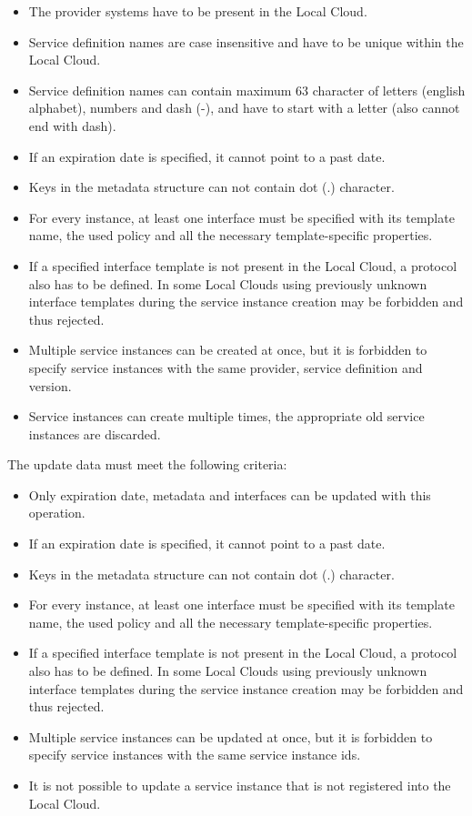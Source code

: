 \documentclass[a4paper]{arrowhead}
\begin{document}
\begin{itemize}
    \item The provider systems have to be present in the Local Cloud.
    \item Service definition names are case insensitive and have to be unique within the Local Cloud.
    \item Service definition names can contain maximum 63 character of letters (english alphabet), numbers and dash (-), and have to start with a letter (also cannot end with dash).
    \item If an expiration date is specified, it cannot point to a past date.
    \item Keys in the metadata structure can not contain dot (.) character.
    \item For every instance, at least one interface must be specified with its template name, the used policy and all the necessary template-specific properties.
    \item If a specified interface template is not present in the Local Cloud, a protocol also has to be defined. In some Local Clouds using previously unknown interface templates during the service instance creation may be forbidden and thus rejected.
    \item Multiple service instances can be created at once, but it is forbidden to specify service instances with the same provider, service definition and version.
    \item Service instances can create multiple times, the appropriate old service instances are discarded.
\end{itemize}


The update data must meet the following criteria:

\begin{itemize}
    \item Only expiration date, metadata and interfaces can be updated with this operation.
    \item If an expiration date is specified, it cannot point to a past date.
    \item Keys in the metadata structure can not contain dot (.) character.
    \item For every instance, at least one interface must be specified with its template name, the used policy and all the necessary template-specific properties.
    \item If a specified interface template is not present in the Local Cloud, a protocol also has to be defined. In some Local Clouds using previously unknown interface templates during the service instance creation may be forbidden and thus rejected.
    \item Multiple service instances can be updated at once, but it is forbidden to specify service instances with the same service instance ids.
    \item It is not possible to update a service instance that is not registered into the Local Cloud.
\end{itemize}
\end{document}
